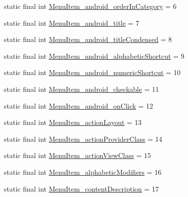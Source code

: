 \begin{DoxyCompactItemize}
\item 
static final int \mbox{\hyperlink{classandroid_1_1support_1_1design_1_1_r_1_1styleable_adb952108c9ed0399e3bcf2e3cce497d4}{Menu\+Item\+\_\+android\+\_\+order\+In\+Category}} = 6
\item 
static final int \mbox{\hyperlink{classandroid_1_1support_1_1design_1_1_r_1_1styleable_a8266068ad0815309f30d5f35e16bfb2f}{Menu\+Item\+\_\+android\+\_\+title}} = 7
\item 
static final int \mbox{\hyperlink{classandroid_1_1support_1_1design_1_1_r_1_1styleable_aa3a614a548134feabb3f1a9e31eac7f0}{Menu\+Item\+\_\+android\+\_\+title\+Condensed}} = 8
\item 
static final int \mbox{\hyperlink{classandroid_1_1support_1_1design_1_1_r_1_1styleable_afee7a912a1adb53b44b84875b958dcc2}{Menu\+Item\+\_\+android\+\_\+alphabetic\+Shortcut}} = 9
\item 
static final int \mbox{\hyperlink{classandroid_1_1support_1_1design_1_1_r_1_1styleable_a764c1fd0541438a30a1874c9e39faa45}{Menu\+Item\+\_\+android\+\_\+numeric\+Shortcut}} = 10
\item 
static final int \mbox{\hyperlink{classandroid_1_1support_1_1design_1_1_r_1_1styleable_a367fcf50180f555cdccedfe8c3c29950}{Menu\+Item\+\_\+android\+\_\+checkable}} = 11
\item 
static final int \mbox{\hyperlink{classandroid_1_1support_1_1design_1_1_r_1_1styleable_af998105acfa886bf8fb67beedd37843e}{Menu\+Item\+\_\+android\+\_\+on\+Click}} = 12
\item 
static final int \mbox{\hyperlink{classandroid_1_1support_1_1design_1_1_r_1_1styleable_acea82da8f9d7bec29eb669375e904049}{Menu\+Item\+\_\+action\+Layout}} = 13
\item 
static final int \mbox{\hyperlink{classandroid_1_1support_1_1design_1_1_r_1_1styleable_a5ccb9af96cb8f5856eabfcc584bbe29e}{Menu\+Item\+\_\+action\+Provider\+Class}} = 14
\item 
static final int \mbox{\hyperlink{classandroid_1_1support_1_1design_1_1_r_1_1styleable_ae854f3663bd672c1729dd9f452823498}{Menu\+Item\+\_\+action\+View\+Class}} = 15
\item 
static final int \mbox{\hyperlink{classandroid_1_1support_1_1design_1_1_r_1_1styleable_ada7f8610f6078b9dee5984fb38a66ad2}{Menu\+Item\+\_\+alphabetic\+Modifiers}} = 16
\item 
static final int \mbox{\hyperlink{classandroid_1_1support_1_1design_1_1_r_1_1styleable_a290ef30f805846fc2b9728fdd6498c50}{Menu\+Item\+\_\+content\+Description}} = 17
\item 

\end{DoxyCompactItemize}
